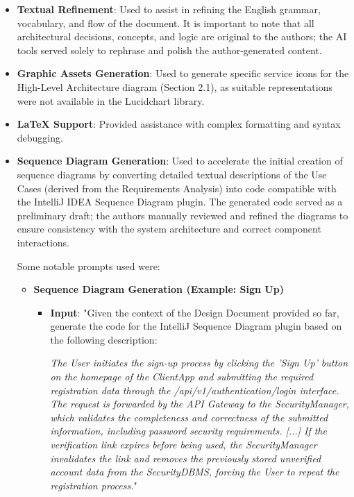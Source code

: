 \begin{itemize}
    \item \textbf{Textual Refinement}: Used to assist in refining the English grammar, vocabulary, and flow of the document. It is important to note that all architectural decisions, concepts, and logic are original to the authors; the AI tools served solely to rephrase and polish the author-generated content.
    
    \item \textbf{Graphic Assets Generation}: Used to generate specific service icons for the High-Level Architecture diagram (Section 2.1), as suitable representations were not available in the Lucidchart library.
    
    \item \textbf{\LaTeX{} Support}: Provided assistance with complex formatting and syntax debugging.
    
\item \textbf{Sequence Diagram Generation}: Used to accelerate the initial creation of sequence diagrams by converting detailed textual descriptions of the Use Cases (derived from the Requirements Analysis) into code compatible with the IntelliJ IDEA Sequence Diagram plugin. 
The generated code served as a preliminary draft; the authors manually reviewed and refined the diagrams to ensure consistency with the system architecture and correct component interactions.
    
    Some notable prompts used were:
    
    \begin{itemize}
        \item \textbf{Sequence Diagram Generation (Example: Sign Up)}
        \begin{itemize}
            \item \textbf{Input}: "Given the context of the Design Document provided so far, generate the code for the IntelliJ Sequence Diagram plugin based on the following description: 
            
            \textit{The User initiates the sign-up process by clicking the 'Sign Up' button on the homepage of the ClientApp and submitting the required registration data through the /api/v1/authentication/login interface. The request is forwarded by the API Gateway to the SecurityManager, which validates the completeness and correctness of the submitted information, including password security requirements. [...] If the verification link expires before being used, the SecurityManager invalidates the link and removes the previously stored unverified account data from the SecurityDBMS, forcing the User to repeat the registration process.}"
            

\end{itemize}
\end{itemize}
\end{itemize}
